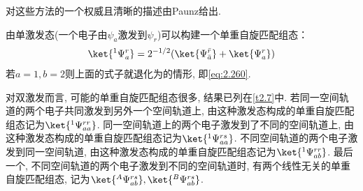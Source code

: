 对这些方法的一个权威且清晰的描述由Paunz给出.


由单激发态(一个电子由$\psi_a$激发到$\psi_r$)可以构建一个单重自旋匹配组态：
\begin{align}
\ket{^1\Psi_a^r} = 2^{-1/2}(\ket{\Psi_{\bar{a}}^{\bar{r}}} + \ket{\Psi_a^r})
\end{align}
若$a=1,b=2$则上面的式子就退化为的情形, 
即\autoref{eq:2.260}.


对双激发而言, 
可能的单重自旋匹配组态很多, 
结果已列在\autoref{t2.7}中. 
若同一空间轨道的两个电子共同激发到另外一个空间轨道上, 
由这种激发态构成的单重自旋匹配组态记为$\ket{^1\Psi_{aa}^{rr}}$. 
同一空间轨道上的两个电子激发到了不同的空间轨道上, 
由这种激发态构成的单重自旋匹配组态记为$\ket{^1\Psi_{aa}^{rs}}$. 
不同空间轨道的两个电子激发到同一空间轨道, 
由这种激发态构成的单重自旋匹配组态记为$\ket{^1\Psi_{ab}^{rr}}$. 
最后一个, 
不同空间轨道的两个电子激发到不同的空间轨道时, 
有两个线性无关的单重自旋匹配组态, 
记为$\ket{^A\Psi_{ab}^{rs}}, \ket{^B\Psi_{ab}^{rs}}$.



